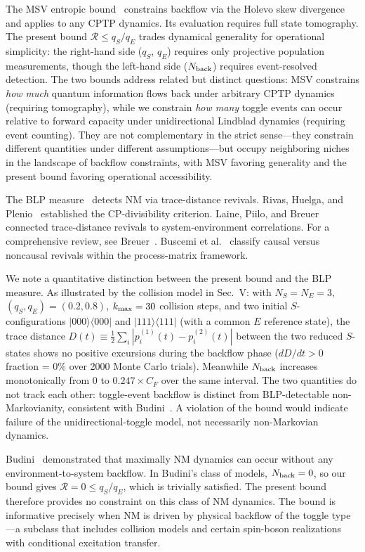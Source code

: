 \documentclass[aps,pra,twocolumn,superscriptaddress,floatfix]{revtex4-2}
\begin{document}
The MSV entropic bound~\cite{Megier:2021} constrains backflow via the Holevo skew divergence and applies to any CPTP dynamics. Its evaluation requires full state tomography. The present bound $\mathcal{R} \leq q_S/q_E$ trades dynamical generality for operational simplicity: the right-hand side ($q_S$, $q_E$) requires only projective population measurements, though the left-hand side ($N_{\rm back}$) requires event-resolved detection. The two bounds address related but distinct questions: MSV constrains \textit{how much} quantum information flows back under arbitrary CPTP dynamics (requiring tomography), while we constrain \textit{how many} toggle events can occur relative to forward capacity under unidirectional Lindblad dynamics (requiring event counting). They are not complementary in the strict sense---they constrain different quantities under different assumptions---but occupy neighboring niches in the landscape of backflow constraints, with MSV favoring generality and the present bound favoring operational accessibility.

The BLP measure~\cite{Breuer:2009, Breuer:2016} detects NM via trace-distance revivals. Rivas, Huelga, and Plenio~\cite{Rivas:2010} established the CP-divisibility criterion. Laine, Piilo, and Breuer~\cite{Laine:2010} connected trace-distance revivals to system-environment correlations. For a comprehensive review, see Breuer~\cite{Breuer:2012}. Buscemi et al.~\cite{Buscemi:2025} classify causal versus noncausal revivals within the process-matrix framework.

We note a quantitative distinction between the present bound and the BLP measure. As illustrated by the collision model in Sec.~V: with $N_S=N_E=3$, $(q_S,q_E)=(0.2,0.8)$, $k_{\rm max}=30$ collision steps, and two initial $S$-configurations $|000\rangle\langle 000|$ and $|111\rangle\langle 111|$ (with a common $E$ reference state), the trace distance $D(t) \equiv \frac{1}{2}\sum_i |p_i^{(1)}(t)-p_i^{(2)}(t)|$ between the two reduced $S$-states shows no positive excursions during the backflow phase ($dD/dt > 0$ fraction = 0\% over 2000 Monte Carlo trials). Meanwhile $N_{\rm back}$ increases monotonically from 0 to $0.247 \times C_F$ over the same interval. The two quantities do not track each other: toggle-event backflow is distinct from BLP-detectable non-Markovianity, consistent with Budini~\cite{Budini:2018}. A violation of the bound would indicate failure of the unidirectional-toggle model, not necessarily non-Markovian dynamics.

Budini~\cite{Budini:2018} demonstrated that maximally NM dynamics can occur without any environment-to-system backflow. In Budini's class of models, $N_{\rm back} = 0$, so our bound gives $\mathcal{R} = 0 \leq q_S/q_E$, which is trivially satisfied. The present bound therefore provides no constraint on this class of NM dynamics. The bound is informative precisely when NM is driven by physical backflow of the toggle type---a subclass that includes collision models and certain spin-boson realizations with conditional excitation transfer.
\end{document}
